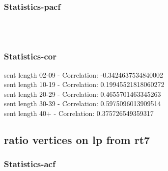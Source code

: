 \documentclass{article}%
\begin{document}
%
\newpage%
\subsubsection{Statistics{-}pacf}%
\label{ssubsec:Statistics{-}pacf}%


\begin{figure}[ht]%
\centering%
\setlength{\abovecaptionskip}{-35pt}%
%
%
\\%
%
%
\\%
%
\end{figure}

%
\newpage%
\subsubsection{Statistics{-}cor}%
\label{ssubsec:Statistics{-}cor}%
\noindent%
sent length 02-09 - Correlation: -0.3424637534840002\\%
sent length 10-19 - Correlation: 0.19945521818060272\\%
sent length 20-29 - Correlation: 0.4655701463345263\\%
sent length 30-39 - Correlation: 0.5975096013909514\\%
sent length 40+ - Correlation: 0.375726549359317\\

%
\newpage

%
\subsection{ratio vertices on lp from rt7}%
\label{subsec:ratioverticesonlpfromrt7}%
\subsubsection{Statistics{-}acf}%
\label{ssubsec:Statistics{-}acf}%
\end{document}
